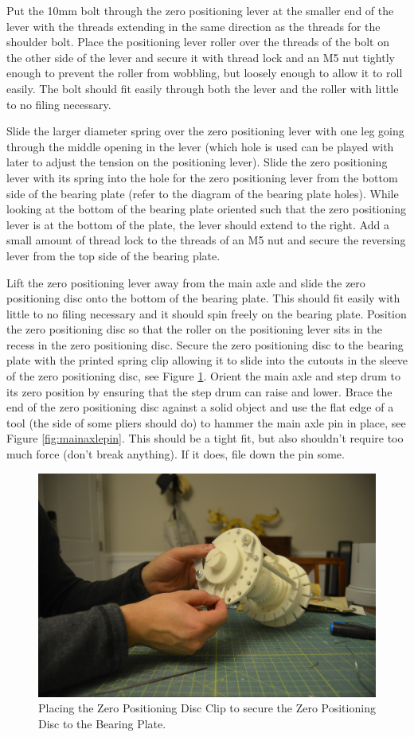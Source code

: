\documentclass[openany]{book}
\begin{document}
Put the 10mm bolt through the zero positioning lever at the smaller end of the lever with the threads extending in the same direction as the threads for the shoulder bolt. Place the positioning lever roller over the threads of the bolt on the other side of the lever and secure it with thread lock and an M5 nut tightly enough to prevent the roller from wobbling, but loosely enough to allow it to roll easily. The bolt should fit easily through both the lever and the roller with little to no filing necessary.

Slide the larger diameter spring over the zero positioning lever with one leg going through the middle opening in the lever (which hole is used can be played with later to adjust the tension on the positioning lever). Slide the zero positioning lever with its spring into the hole for the zero positioning lever from the bottom side of the bearing plate (refer to the diagram of the bearing plate holes). While looking at the bottom of the bearing plate oriented such that the zero positioning lever is at the bottom of the plate, the lever should extend to the right. Add a small amount of thread lock to the threads of an M5 nut and secure the reversing lever from the top side of the bearing plate.

Lift the zero positioning lever away from the main axle and slide the zero positioning disc onto the bottom of the bearing plate. This should fit easily with little to no filing necessary and it should spin freely on the bearing plate. Position the zero positioning disc so that the roller on the positioning lever sits in the recess in the zero positioning disc. Secure the zero positioning disc to the bearing plate with the printed spring clip allowing it to slide into the cutouts in the sleeve of the zero positioning disc, see Figure \ref{fig:image29}. Orient the main axle and step drum to its zero position by ensuring that the step drum can raise and lower. Brace the end of the zero positioning disc against a solid object and use the flat edge of a tool (the side of some pliers should do) to hammer the main axle pin in place, see Figure \ref{fig:mainaxlepin}. This should be a tight fit, but also shouldn’t require too much force (don’t break anything). If it does, file down the pin some. 

\begin{figure}[!ht]
	\centering
	\includegraphics[width=.75\textwidth]{images/image29.jpg}
	\caption{Placing the Zero Positioning Disc Clip to secure the Zero Positioning Disc to the Bearing Plate.}
	\label{fig:image29}	
\end{figure}
\end{document}
